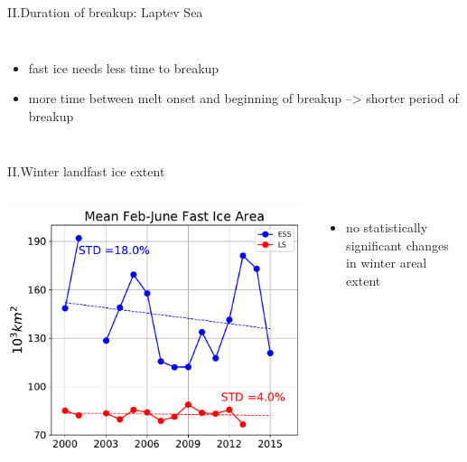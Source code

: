 \documentclass[8pt]{beamer}
\begin{document}
\begin{frame}[fragile]{II.Duration of breakup: Laptev Sea}
\begin{columns}
		\begin{itemize}
		\item fast ice needs less time to breakup
		\item more time between melt onset and beginning of breakup --> shorter period of breakup
		\end{itemize}
	\end{columns}
\end{frame}


\setwatermark{\fontsize{125pt}{125pt}\selectfont{}}
\begin{frame}[fragile]{II.Winter landfast ice extent}
	\begin{columns}
		\includegraphics[width=1\textwidth]{./img/WinterArea_FebMay.pdf}
		\begin{itemize}
			\item no statistically significant changes in winter areal extent
		\end{itemize}
	\end{columns}
\end{frame}
\end{document}
